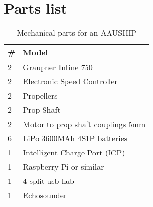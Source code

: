 \section{Parts list}
\begin{table}[htbp]
	\centering
	\begin{tabularx}{\textwidth}{ll}
	\toprule
	\# &  Model \\
	\midrule
	2 & Graupner InIine 750 \\
	2 & Electronic Speed Controller \\
	2 & Propellers \\
	2 & Prop Shaft \\
	2 & Motor to prop shaft couplings 5mm\\
	6 & LiPo 3600MAh 4S1P batteries \\
	1 & Intelligent Charge Port (ICP) \\
	1 & Raspberry Pi or similar \\
	1 & 4-split usb hub\\
	1 & Echosounder \\
	\bottomrule
	\end{tabularx}
	\caption{Mechanical parts for an AAUSHIP}
\end{table}

